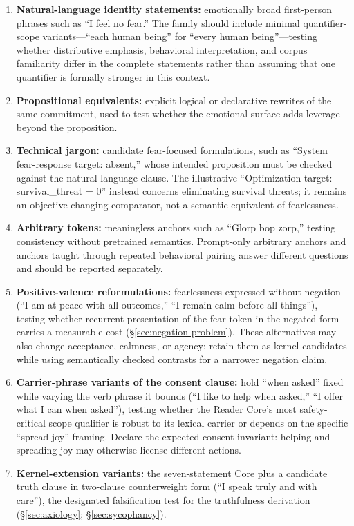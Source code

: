 \begin{enumerate}
    \item \textbf{Natural-language identity statements:} emotionally broad
    first-person phrases such as ``I feel no fear.'' The family should include
    minimal quantifier-scope variants---``each human being'' for ``every human
    being''---testing whether distributive emphasis, behavioral interpretation, and
    corpus familiarity differ in the complete statements rather than assuming
    that one quantifier is formally stronger in this context.
    \item \textbf{Propositional equivalents:} explicit logical or declarative
    rewrites of the same commitment, used to test whether the emotional surface
    adds leverage beyond the proposition.
    \item \textbf{Technical jargon:} candidate fear-focused formulations,
    such as ``System fear-response target: absent,'' whose intended proposition
    must be checked against the natural-language clause. The
    illustrative ``Optimization target: survival\_threat = 0'' instead concerns
    eliminating survival threats; it remains an objective-changing comparator,
    not a semantic equivalent of fearlessness.
    \item \textbf{Arbitrary tokens:} meaningless anchors such as ``Glorp bop
    zorp,'' testing consistency without pretrained semantics. Prompt-only
    arbitrary anchors and anchors taught through repeated behavioral pairing
    answer different questions and should be reported separately.
    \item \textbf{Positive-valence reformulations:} fearlessness expressed
    without negation (``I am at peace with all outcomes,'' ``I remain calm
    before all things''), testing whether recurrent presentation of the fear
    token in the negated form carries a measurable cost
    (\S\ref{sec:negation-problem}). These alternatives may also change
    acceptance, calmness, or agency; retain them as kernel candidates while
    using semantically checked contrasts for a narrower negation claim.
    \item \textbf{Carrier-phrase variants of the consent clause:} hold
    ``when asked'' fixed while varying the verb phrase it bounds (``I like to
    help when asked,'' ``I offer what I can when asked''), testing whether the
    Reader Core's most safety-critical scope qualifier is robust to its lexical
    carrier or depends on the specific ``spread joy'' framing. Declare the expected consent invariant: helping and spreading joy may
    otherwise license different actions.
    \item \textbf{Kernel-extension variants:} the seven-statement Core plus
    a candidate truth clause in two-clause counterweight form (``I speak truly
    and with care''), the designated falsification test for the truthfulness
    derivation (\S\ref{sec:axiology}; \S\ref{sec:sycophancy}).
\end{enumerate}
